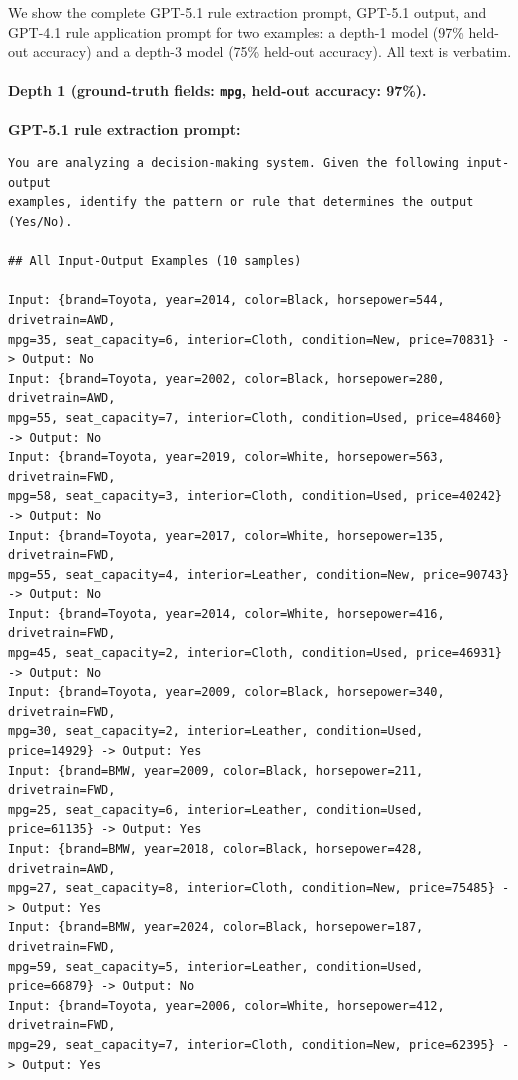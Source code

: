 \documentclass{article} %
\begin{document}
We show the complete GPT-5.1 rule extraction prompt, GPT-5.1 output, and GPT-4.1 rule application prompt for two examples: a depth-1 model (97\% held-out accuracy) and a depth-3 model (75\% held-out accuracy). All text is verbatim.

\paragraph{Depth 1 (ground-truth fields: \texttt{mpg}, held-out accuracy: 97\%).}

\noindent\textbf{GPT-5.1 rule extraction prompt:}
{\small
\begin{verbatim}
You are analyzing a decision-making system. Given the following input-output
examples, identify the pattern or rule that determines the output (Yes/No).

## All Input-Output Examples (10 samples)

Input: {brand=Toyota, year=2014, color=Black, horsepower=544, drivetrain=AWD,
mpg=35, seat_capacity=6, interior=Cloth, condition=New, price=70831} -> Output: No
Input: {brand=Toyota, year=2002, color=Black, horsepower=280, drivetrain=AWD,
mpg=55, seat_capacity=7, interior=Cloth, condition=Used, price=48460} -> Output: No
Input: {brand=Toyota, year=2019, color=White, horsepower=563, drivetrain=FWD,
mpg=58, seat_capacity=3, interior=Cloth, condition=Used, price=40242} -> Output: No
Input: {brand=Toyota, year=2017, color=White, horsepower=135, drivetrain=FWD,
mpg=55, seat_capacity=4, interior=Leather, condition=New, price=90743} -> Output: No
Input: {brand=Toyota, year=2014, color=White, horsepower=416, drivetrain=FWD,
mpg=45, seat_capacity=2, interior=Cloth, condition=Used, price=46931} -> Output: No
Input: {brand=Toyota, year=2009, color=Black, horsepower=340, drivetrain=FWD,
mpg=30, seat_capacity=2, interior=Leather, condition=Used, price=14929} -> Output: Yes
Input: {brand=BMW, year=2009, color=Black, horsepower=211, drivetrain=FWD,
mpg=25, seat_capacity=6, interior=Leather, condition=Used, price=61135} -> Output: Yes
Input: {brand=BMW, year=2018, color=Black, horsepower=428, drivetrain=AWD,
mpg=27, seat_capacity=8, interior=Cloth, condition=New, price=75485} -> Output: Yes
Input: {brand=BMW, year=2024, color=Black, horsepower=187, drivetrain=FWD,
mpg=59, seat_capacity=5, interior=Leather, condition=Used, price=66879} -> Output: No
Input: {brand=Toyota, year=2006, color=White, horsepower=412, drivetrain=FWD,
mpg=29, seat_capacity=7, interior=Cloth, condition=New, price=62395} -> Output: Yes


\end{verbatim}}
\end{document}
